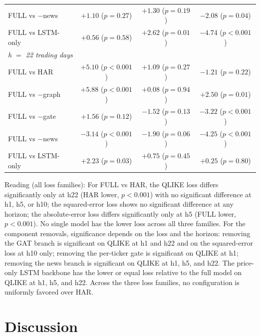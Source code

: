 \documentclass[runningheads]{llncs}
\begin{document}
\begin{table}[t]
\begin{tabular}{lccc}
FULL vs $-$news   & $+1.10$ (\(p=0.27\)) & $+1.30$ (\(p=0.19\)) & $\mathbf{-2.08}$ (\(p=0.04\)) \\
FULL vs LSTM-only & $+0.56$ (\(p=0.58\)) & $\mathbf{+2.62}$ (\(p=0.01\)) & $\mathbf{-4.74}$ (\(p<0.001\)) \\
\midrule
\multicolumn{4}{l}{\emph{h $=$ 22 trading days}} \\
FULL vs HAR       & $\mathbf{+5.10}$ (\(p<0.001\)) & $+1.09$ (\(p=0.27\)) & $-1.21$ (\(p=0.22\)) \\
FULL vs $-$graph  & $\mathbf{+5.88}$ (\(p<0.001\)) & $+0.08$ (\(p=0.94\)) & $\mathbf{+2.50}$ (\(p=0.01\)) \\
FULL vs $-$gate   & $+1.56$ (\(p=0.12\)) & $-1.52$ (\(p=0.13\)) & $\mathbf{-3.22}$ (\(p<0.001\)) \\
FULL vs $-$news   & $\mathbf{-3.14}$ (\(p<0.001\)) & $-1.90$ (\(p=0.06\)) & $\mathbf{-4.25}$ (\(p<0.001\)) \\
FULL vs LSTM-only & $\mathbf{+2.23}$ (\(p=0.03\)) & $+0.75$ (\(p=0.45\)) & $+0.25$ (\(p=0.80\)) \\
\bottomrule
\end{tabular}
\end{table}

Reading (all loss families): For FULL vs HAR, the QLIKE loss differs significantly only at h22 (HAR lower,
$p<0.001$) with no significant difference at h1, h5, or h10; the squared-error loss shows no significant
difference at any horizon; the absolute-error loss differs significantly only at h5 (FULL lower,
$p<0.001$). No single model has the lower loss across all three families. For the component removals,
significance depends on the loss and the horizon: removing the GAT branch is significant on QLIKE at h1 and
h22 and on the squared-error loss at h10 only; removing the per-ticker gate is significant on QLIKE at h1;
removing the news branch is significant on QLIKE at h1, h5, and h22. The price-only LSTM backbone has the
lower or equal loss relative to the full model on QLIKE at h1, h5, and h22. Across the three loss families,
no configuration is uniformly favored over HAR.

\section{Discussion}
\label{sec:discussion}
\end{document}
